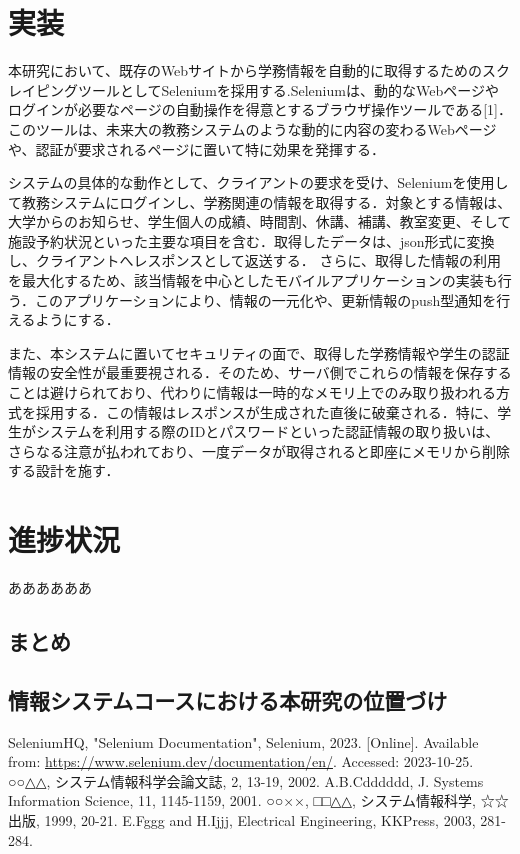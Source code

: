 \documentclass[11pt]{ujarticle}
\begin{document}
\section{実装}

本研究において、既存のWebサイトから学務情報を自動的に取得するためのスクレイピングツールとしてSeleniumを採用する.Seleniumは、動的なWebページやログインが必要なページの自動操作を得意とするブラウザ操作ツールである[1]．このツールは、未来大の教務システムのような動的に内容の変わるWebページや、認証が要求されるページに置いて特に効果を発揮する．

システムの具体的な動作として、クライアントの要求を受け、Seleniumを使用して教務システムにログインし、学務関連の情報を取得する．対象とする情報は、大学からのお知らせ、学生個人の成績、時間割、休講、補講、教室変更、そして施設予約状況といった主要な項目を含む．取得したデータは、json形式に変換し、クライアントへレスポンスとして返送する．
さらに、取得した情報の利用を最大化するため、該当情報を中心としたモバイルアプリケーションの実装も行う．このアプリケーションにより、情報の一元化や、更新情報のpush型通知を行えるようにする．

また、本システムに置いてセキュリティの面で、取得した学務情報や学生の認証情報の安全性が最重要視される．そのため、サーバ側でこれらの情報を保存することは避けられており、代わりに情報は一時的なメモリ上でのみ取り扱われる方式を採用する．この情報はレスポンスが生成された直後に破棄される．特に、学生がシステムを利用する際のIDとパスワードといった認証情報の取り扱いは、さらなる注意が払われており、一度データが取得されると即座にメモリから削除する設計を施す．

\section{進捗状況}

ああああああ

\subsection{まとめ}


\subsection{情報システムコースにおける本研究の位置づけ}



\begin{thebibliography}{99}
	SeleniumHQ, "Selenium Documentation", Selenium, 2023. [Online]. Available from: \url{https://www.selenium.dev/documentation/en/}. Accessed: 2023-10-25.
	○○△△, システム情報科学会論文誌, 2, 13-19, 2002.
	A.B.Cdddddd, J. Systems Information Science, 11, 1145-1159, 2001.
	○○××, □□△△, システム情報科学, ☆☆出版, 1999, 20-21.
	E.Fggg and H.Ijjj, Electrical Engineering, KKPress, 2003, 281-284.
\end{thebibliography}
\end{document}
